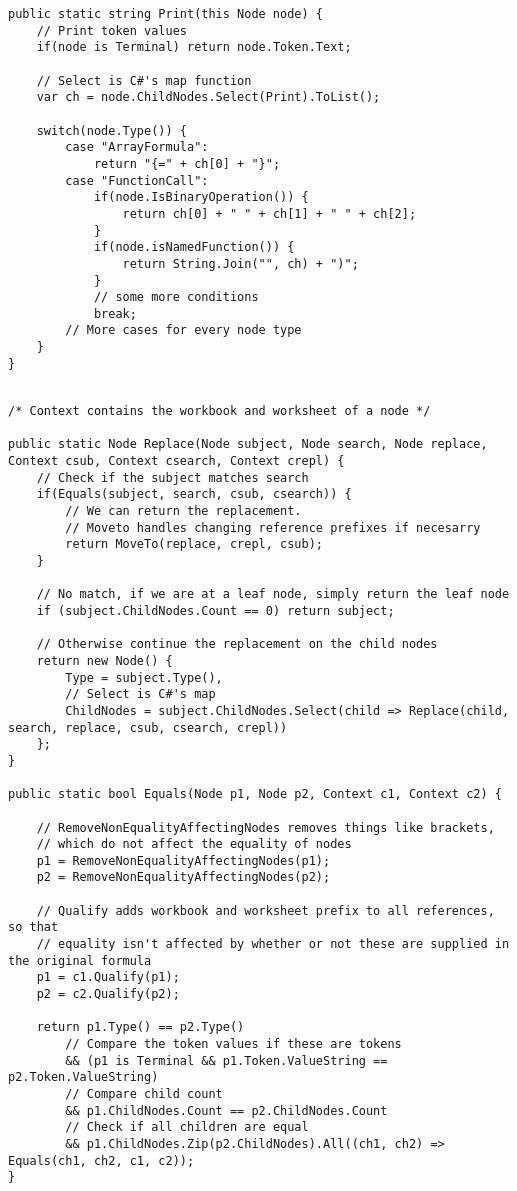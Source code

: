 \lstset{style=sharpc}
\begin{lstlisting}[float,caption={XLParser Print method (simplified)}, label={lst:xlparserprint}]
public static string Print(this Node node) {
	// Print token values
	if(node is Terminal) return node.Token.Text;
	
	// Select is C#'s map function
	var ch = node.ChildNodes.Select(Print).ToList();
	
	switch(node.Type()) {
		case "ArrayFormula":
			return "{=" + ch[0] + "}";
		case "FunctionCall":
			if(node.IsBinaryOperation()) {
				return ch[0] + " " + ch[1] + " " + ch[2];
			}
			if(node.isNamedFunction()) {
				return String.Join("", ch) + ")";
			}
			// some more conditions
			break;
		// More cases for every node type
	}
}
\end{lstlisting}

\lstset{style=sharpc}
\begin{lstlisting}[float,caption={Formula AST replacement (simplified)}, label={lst:astreplace}]

/* Context contains the workbook and worksheet of a node */

public static Node Replace(Node subject, Node search, Node replace, Context csub, Context csearch, Context crepl) {
	// Check if the subject matches search
	if(Equals(subject, search, csub, csearch)) {
		// We can return the replacement.
		// Moveto handles changing reference prefixes if necesarry 
		return MoveTo(replace, crepl, csub);
	}
	
	// No match, if we are at a leaf node, simply return the leaf node
	if (subject.ChildNodes.Count == 0) return subject;
	
	// Otherwise continue the replacement on the child nodes
	return new Node() {
		Type = subject.Type(),
		// Select is C#'s map
		ChildNodes = subject.ChildNodes.Select(child => Replace(child, search, replace, csub, csearch, crepl))
	};
}

public static bool Equals(Node p1, Node p2, Context c1, Context c2) {
	
	// RemoveNonEqualityAffectingNodes removes things like brackets,
	// which do not affect the equality of nodes
	p1 = RemoveNonEqualityAffectingNodes(p1);
	p2 = RemoveNonEqualityAffectingNodes(p2);
	
	// Qualify adds workbook and worksheet prefix to all references, so that
	// equality isn't affected by whether or not these are supplied in the original formula
	p1 = c1.Qualify(p1);
	p2 = c2.Qualify(p2);
	
	return p1.Type() == p2.Type()
		// Compare the token values if these are tokens
	    && (p1 is Terminal && p1.Token.ValueString == p2.Token.ValueString)
	    // Compare child count
	    && p1.ChildNodes.Count == p2.ChildNodes.Count
	    // Check if all children are equal
	    && p1.ChildNodes.Zip(p2.ChildNodes).All((ch1, ch2) => Equals(ch1, ch2, c1, c2));
}
\end{lstlisting}

